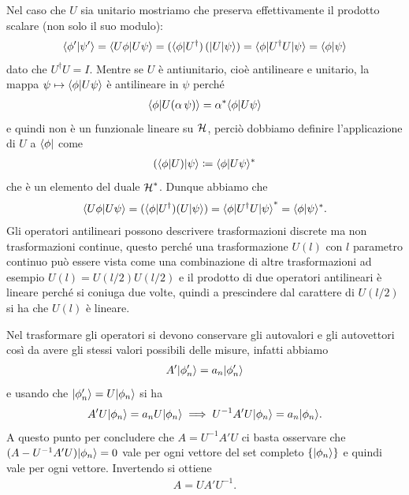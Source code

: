 Nel caso che $ U $ sia unitario mostriamo che preserva effettivamente il prodotto scalare (non solo il suo modulo):
\begin{align*}
  \bk{\phi' | \psi'} = \bk{U \phi | U \psi} = (\b{\phi} U^\dagger) \, (\k{U |\psi}) = \bk{\phi | U^\dagger U | \psi} = \bk{\phi | \psi}
\end{align*}
dato che $ U^\dagger U = I $. Mentre se $ U $ è antiunitario, cioè antilineare e unitario, la mappa $\psi \mapsto \bk{\phi | U \psi}$ 
è antilineare in $ \psi $ perché 
\begin{align*}
  \bk{\phi | U(\alpha\, \psi)} = \alpha^* \bk{\phi | U\psi}
\end{align*}
e quindi non è un funzionale lineare su $ \operatorname{\mathcal{H}} $, perciò dobbiamo definire l'applicazione di $ U $ a $ \b{\phi} $ come 
\begin{align*}
  (\b{\phi} U) \k{\psi} \coloneq \bk{\phi | U\psi }^*
\end{align*}
che è un elemento del duale $ \operatorname{\mathcal{H}}^* $. Dunque abbiamo che 
\begin{align*}
  \bk{U \phi | U \psi} = (\b{\phi} U^\dagger) (U \k{\psi}) = {\bk{\phi | U^\dagger U | \psi}}^* = \bk{\phi |\psi}^*.
\end{align*}
Gli operatori antilineari possono descrivere trasformazioni discrete ma non trasformazioni continue, questo perché una trasformazione $ U(l) $ 
con $ l $ parametro continuo può essere vista come una combinazione di altre trasformazioni ad esempio $ U(l) = U(l/2) U(l/2) $ e il prodotto 
di due operatori antilineari è lineare perché si coniuga due volte, quindi a prescindere dal carattere di $ U(l/2) $ si ha che $ U(l) $ è lineare.

Nel trasformare gli operatori si devono conservare gli autovalori e gli autovettori così da avere gli stessi valori possibili delle misure, infatti 
abbiamo
\begin{align*}
  A'\k{\phi'_n} = a_n \k{\phi'_n} 
\end{align*}
e usando che $ \k{\phi'_n} = U \k{\phi_n} $ si ha
\begin{align*}
  A' U \k{\phi_n } = a_n U\k{\phi_n} \implies U^{-1} A' U \k{\phi_n} = a_n \k{\phi_n}.
\end{align*}
A questo punto per concludere che $ A = U^{-1} A' U $ ci basta osservare che $ (A - U^{-1} A' U )\k{\phi_n} = 0 $ vale per ogni vettore 
del set completo $ \{\k{\phi_n}\} $ e quindi vale per ogni vettore. Invertendo si ottiene  
\begin{align*}
  A = U A' U^{-1}.
\end{align*}

